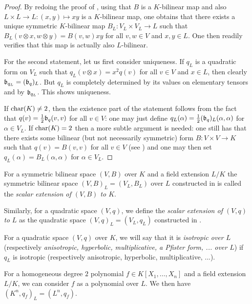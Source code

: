 \documentclass[12pt, leqno, british]{amsart}
\begin{document}
\begin{proof}
By redoing the proof of , using that $B$ is a $K$-bilinear map and also $L \times L \to L : (x, y) \mapsto xy$ is a $K$-bilinear map, one obtains that there exists a unique symmetric $K$-bilinear map $B_L : V_L \times V_L \to L$ such that $B_L(v \otimes x, w \otimes y) = B(v, w)xy$ for all $v, w \in V$ and $x, y \in L$.
One then readily verifies that this map is actually also $L$-bilinear.

For the second statement, let us first consider uniqueness.
If $q_L$ is a quadratic form on $V_L$ such that $q_L(v \otimes x) = x^2 q(v)$ for all $v \in V$ and $x \in L$, then clearly $\mathfrak{b}_{q_L} = (\mathfrak{b}_q)_L$.
But $q_L$ is completely determined by its values on elementary tensors and by $\mathfrak{b}_{q_L}$.
This shows uniqueness.

If $\operatorname{char}(K) \neq 2$, then the existence part of the statement follows from the fact that $q(v) = \frac{1}{2}\mathfrak{b}_q(v, v)$ for all $v \in V$: one may just define $q_L(\alpha) = \frac{1}{2}(\mathfrak{b}_q)_L(\alpha, \alpha)$ for $\alpha \in V_L$.
If $\operatorname{char}(K) = 2$ then a more subtle argument is needed: one still has that there exists some bilinear (but not necessarily symmetric) form $B : V \times V \to K$ such that $q(v) = B(v, v)$ for all $v \in V$ (see \autocite[Section 7]{ElmanKarpenkoMerkurjev}) and one may then set $q_L(\alpha) = B_L(\alpha, \alpha)$ for $\alpha \in V_L$.
\end{proof}
\begin{defi}\label{D:scalar-extension}
For a symmetric bilinear space $(V, B)$ over $K$ and a field extension $L/K$ the symmetric bilinear space $(V, B)_L = (V_L, B_L)$ over $L$ constructed in  is called the \emph{scalar extension of $(V, B)$ to $K$}.

Similarly, for a quadratic space $(V, q)$, we define the \emph{scalar extension of $(V, q)$ to $L$} as the quadratic space $(V, q)_L = (V_L, q_L)$ constructed in .

For a quadratic space $(V, q)$ over $K$, we will say that it is \emph{isotropic over $L$} (respectively \emph{anisotropic, hyperbolic, multiplicative, a Pfister form, ... over $L$}) if $q_L$ is isotropic (respectively anisotropic, hyperbolic, multiplicative, ...).
\end{defi}
\begin{rem}
For a homogeneous degree $2$ polynomial $f \in K[X_1, \ldots, X_n]$ and a field extension $L/K$, we can consider $f$ as a polynomial over $L$.
We then have $(K^n, q_f)_L = (L^n, q_f)$.
\end{rem}
\end{document}
